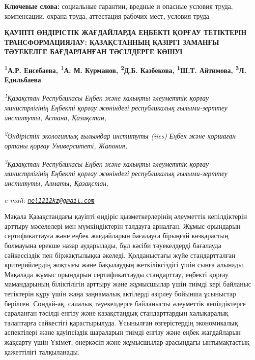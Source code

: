 {\bfseries Ключевые слова:} социальные гарантии, вредные и опасные условия
труда, компенсации, охрана труда, аттестация рабочих мест, условия труда

\begin{articleheader}
{\bfseries ҚАУІПТІ ӨНДІРІСТІК ЖАҒДАЙЛАРДА ЕҢБЕКТІ ҚОРҒАУ ТЕТІКТЕРІН ТРАНСФОРМАЦИЯЛАУ: ҚАЗАҚСТАННЫҢ ҚАЗІРГІ ЗАМАНҒЫ ТӘУЕКЕЛГЕ БАҒДАРЛАНҒАН ТӘСІЛДЕРГЕ КӨШУІ}

{\bfseries
\textsuperscript{1}А.Р. Енсебаева\textsuperscript{\envelope },
\textsuperscript{1}А. М. Курманов,
\textsuperscript{2}Д.Б. Казбекова,
\textsuperscript{1}Ш.Т. Айтимова,
\textsuperscript{3}Л. Едильбаева}
\end{articleheader}

\begin{affiliation}
\emph{\textsuperscript{1}Қазақстан Республикасы Еңбек және халықты әлеуметтік қорғау министрлігінің Еңбекті қорғау жөніндегі республикалық ғылыми-зерттеу институты, Астана, Қазақстан,}

\emph{\textsuperscript{2}Өндірістік экологиялық ғылымдар институты (iies) Еңбек және қоршаған ортаны қорғау Университеті, Жапония,}

\emph{\textsuperscript{3}Қазақстан Республикасы Еңбек және халықты әлеуметтік қорғау министрлігінің Еңбекті қорғау жөніндегі республикалық ғылыми-зерттеу институты, Алматы, Қазақстан,}

\emph{e-mail: \href{mailto:nel1212kz@gmail.com}{\nolinkurl{nel1212kz@gmail.com}}}
\end{affiliation}

Мақала Қазақстандағы қауіпті өндіріс қызметкерлерінің әлеуметтік
кепілдіктерін арттыру мәселелері мен мүмкіндіктерін талдауға арналған.
Жұмыс орындарын сертификаттауға және еңбек жағдайларын бағалауға
бірыңғай көзқарастың болмауына ерекше назар аударылады, бұл кәсіби
тәуекелдерді бағалауда сәйкессіздік пен біржақтылыққа әкеледі.
Қолданыстағы жүйе стандартталған критерийлердің жоқтығы және бақылаудың
жеткіліксіздігі үшін сынға алынады. Мақалада жұмыс орындарын
сертификаттауды стандарттау, еңбекті қорғау мамандарының біліктілігін
арттыру және жұмысшылар үшін тиімді кері байланыс тетіктерін құру үшін
жаңа заңнамалық актілерді әзірлеу бойынша ұсыныстар берілген. Сондай-ақ,
салалық тәуекелдерге байланысты әлеуметтік кепілдіктерге сараланған
тәсілді енгізу және қазақстандық стандарттардың халықаралық талаптарға
сәйкестігі қарастырылуда. Ұсынылған өзгерістердің экономикалық
аспектілері және қауіпсіздік шараларын тиімді енгізу және еңбек
жағдайларын жақсарту үшін Үкімет, өнеркәсіп және жұмысшылар арасындағы
ынтымақтастық қажеттілігі талқыланады.

